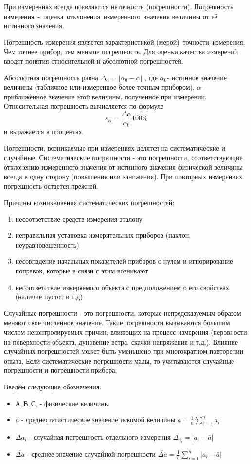 \documentclass[a5paper, 10pt]{diss_4}
\renewcommand{\'}{\,'}
\begin{document}
 При измерениях всегда появляются неточности (погрешности). Погрешность
измерения - оценка отклонения измеренного значения величины от её истинного
значения.

 Погрешность измерения является характеристикой (мерой) точности измерения.
Чем точнее прибор, тем меньше погрешность. Для оценки качества измерений
вводят понятия относительной и абсолютной погрешностей.

  Абсолютная погрешность равна $\Delta_\alpha=|\alpha_0-\alpha|$ , где
$\alpha_0$- истинное значение величины (табличное или измеренное более точным
прибором), $\alpha$ - приближённое значение этой величины, полученное при
измерении. Относительная погрешность вычисляется по формуле
\[\varepsilon_\alpha=\frac{\Delta\alpha}{\alpha_0}100\%\] и выражается в
процентах.

  Погрешности, возникаемые при измерениях делятся на систематические и
случайные. Систематические погрешности - это погрешности, соответствующие
отклонению измеренного значения от истинного значения физической величины
всегда в одну сторону (повышения или занижения). При повторных измерениях
погрешность остается прежней.

Причины возникновения систематических погрешностей:
\begin{enumerate}
  \item несоответствие средств измерения эталону
  \item неправильная установка измерительных приборов (наклон, неуравновешенность)
  \item несовпадение начальных показателей приборов с нулем и игнорирование поправок, которые в связи с этим возникают
  \item несоответствие измеряемого объекта с предположением о его свойствах (наличие пустот и т.д)
\end{enumerate}

  Случайные погрешности - это погрешности, которые непредсказуемым образом
меняют свое численное значение. Такие погрешности вызываются большим числом
неконтролируемых причин, влияющих на процесс измерения (неровности на
поверхности объекта, дуновение ветра, скачки напряжения и т.д.). Влияние
случайных погрешностей может быть уменьшено при многократном повторении
опыта. Если систематические погрешности малы, то учитываются случайные
погрешности и погрешности прибора.

   Введём следующие обозначения:

\begin{itemize}
  \item{ $А, В, С$, - физические величины
  }
  \item{ $\bar{a}$ - среднестатистическое значение искомой величины
  $\bar{a}=\frac{1}{n}\sum\limits_{i=1}^{n}a_i$
  }
  \item{ $\Delta a_i$ - случайная погрешность отдельного измерения
  $\Delta_{a_i}=|a_i-\bar{a}|$
  }
  \item{ $\overline{\Delta a}$ - среднее значение случайной погрешности
  $\overline{\Delta a}=\frac{1}{n}\sum\limits_{i=1}^{n}|a_i-\bar{a}|$
  }
\end{itemize}
\end{document}
